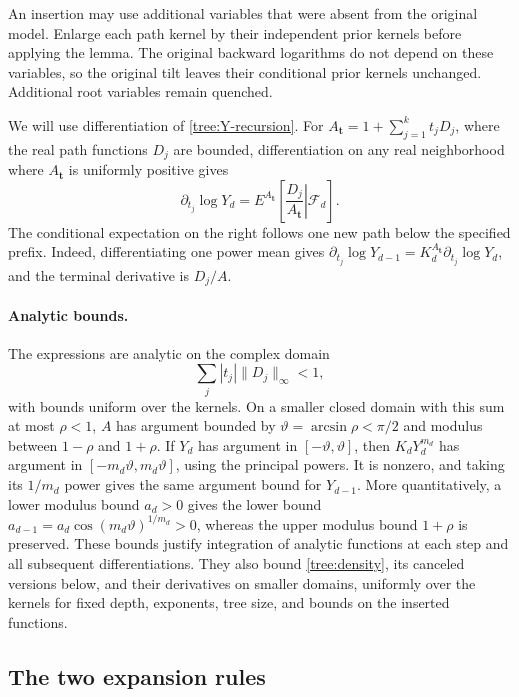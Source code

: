 An insertion may use additional variables that were absent from the
original model.  Enlarge each path kernel by their independent prior
kernels before applying the lemma.  The original backward logarithms
do not depend on these variables, so the original tilt leaves their
conditional prior kernels unchanged.  Additional root variables remain
quenched.

We will use differentiation of \eqref{tree:Y-recursion}.  For
$A_{\boldsymbol t}=1+\sum_{j=1}^k t_jD_j$, where the real path functions
$D_j$ are bounded, differentiation on any real neighborhood where
$A_{\boldsymbol t}$ is uniformly positive gives
\begin{equation}\label{tree:first-variation}
  \partial_{t_j}\log Y_d
  =E^{A_{\boldsymbol t}}\left[
       \left.\frac{D_j}{A_{\boldsymbol t}}\right|\mathscr F_d\right].
\end{equation}
The conditional expectation on the right follows one new path below
the specified prefix.  Indeed, differentiating one power mean gives
$\partial_{t_j}\log Y_{d-1}=K_d^{A_{\boldsymbol t}}
\partial_{t_j}\log Y_d$, and the terminal derivative is $D_j/A$.

\paragraph{Analytic bounds.}
The expressions are analytic on the complex domain
\[
 \sum_j|t_j|\|D_j\|_\infty<1,
\]
with bounds uniform over the kernels.
On a smaller closed domain with this sum at most $\rho<1$, $A$ has argument bounded
by $\vartheta=\arcsin\rho<\pi/2$ and modulus between $1-\rho$ and
$1+\rho$.  If $Y_d$ has argument in $[-\vartheta,\vartheta]$, then
$K_dY_d^{m_d}$ has argument in
$[-m_d\vartheta,m_d\vartheta]$, using the principal powers.  It is
nonzero, and taking its $1/m_d$ power gives the same argument bound
for $Y_{d-1}$.  More quantitatively, a lower modulus bound $a_d>0$
gives the lower bound
$a_{d-1}=a_d\cos(m_d\vartheta)^{1/m_d}>0$, whereas the upper modulus
bound $1+\rho$ is preserved.  These bounds justify integration of
analytic functions at each step and all subsequent differentiations.
They also bound \eqref{tree:density}, its canceled versions below,
and their derivatives on smaller domains, uniformly over the kernels
for fixed depth, exponents, tree size, and bounds on the inserted
functions.

\subsection{The two expansion rules}

